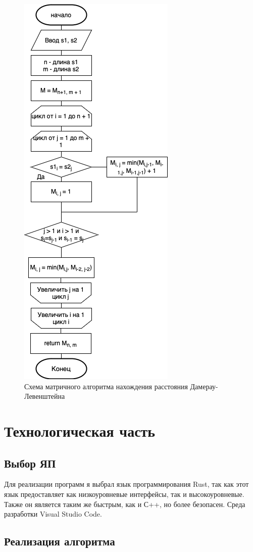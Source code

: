 \documentclass[12pt]{report}
\begin{document}
\begin{figure}[h]
	\centering
	\includegraphics[width=0.5\linewidth]{dam_lev_iter.png}
	\caption{Схема матричного алгоритма нахождения расстояния Дамерау-Левенштейна}
	\label{fig:mpr}
\end{figure}

\chapter{Технологическая часть}
\section{Выбор ЯП}
Для реализации программ я выбрал язык программирования Rust, так как этот язык предоставляет как низкоуровневые интерфейсы, так и высокоуровневые. Также он является таким же быстрым, как и С++, но более безопасен. Среда разработки Visual Studio Code.

\section{Реализация алгоритма}
		
\end{document}
